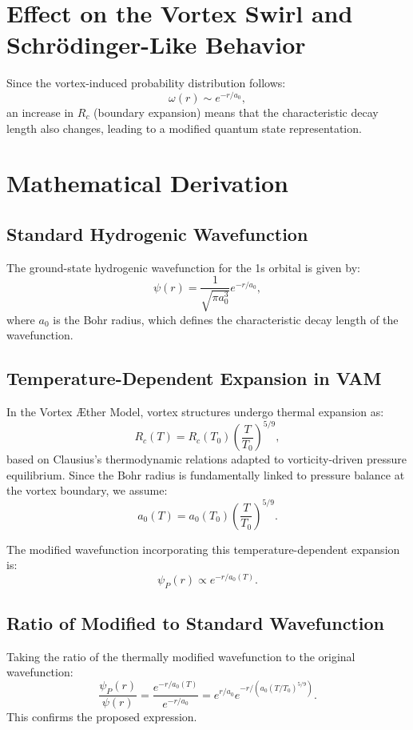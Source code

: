 \documentclass[a4paper,10pt]{article}
\begin{document}
  \section{Effect on the Vortex Swirl and Schr\"{o}dinger-Like Behavior}
  Since the vortex-induced probability distribution follows:
  \begin{equation*}
    \omega(r) \sim e^{-r/a_0},
  \end{equation*}
  an increase in $R_c$ (boundary expansion) means that the characteristic decay length also changes, leading to a modified quantum state representation.

  \section{Mathematical Derivation}
  \subsection{Standard Hydrogenic Wavefunction}
  The ground-state hydrogenic wavefunction for the 1s orbital is given by:
  \begin{equation*}
    \psi(r) = \frac{1}{\sqrt{\pi a_0^3}} e^{-r/a_0},
  \end{equation*}
  where $a_0$ is the Bohr radius, which defines the characteristic decay length of the wavefunction.

  \subsection{Temperature-Dependent Expansion in VAM}
  In the Vortex Æther Model, vortex structures undergo thermal expansion as:
  \begin{equation*}
    R_c(T) = R_c (T_0) \left( \frac{T}{T_0} \right)^{5/9},
  \end{equation*}
  based on Clausius's thermodynamic relations adapted to vorticity-driven pressure equilibrium. Since the Bohr radius is fundamentally linked to pressure balance at the vortex boundary, we assume:
  \begin{equation*}
    a_0(T) = a_0 (T_0) \left( \frac{T}{T_0} \right)^{5/9}.
  \end{equation*}

  The modified wavefunction incorporating this temperature-dependent expansion is:
  \begin{equation*}
    \psi_P(r) \propto e^{-r/a_0(T)}.
  \end{equation*}

  \subsection{Ratio of Modified to Standard Wavefunction}
  Taking the ratio of the thermally modified wavefunction to the original wavefunction:
  \begin{equation*}
    \frac{\psi_P(r)}{\psi(r)} = \frac{e^{-r/a_0(T)}}{e^{-r/a_0}} = e^{r/a_0} e^{-r / (a_0 (T/T_0)^{5/9})}.
  \end{equation*}
  This confirms the proposed expression.
\end{document}
